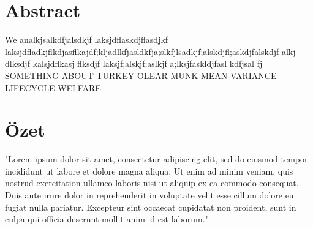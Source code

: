 \chapter*{Abstract}
\ttitle

\vspace{20pt}

We analkjsalkdfjalsdkjf laksjdflaskdjflasdjkf laksjdfladkjflkdjasflkajdf;kljadlkfjasldkfja;slkfjlsadkjf;alskdjfl;askdjfalskdjf alkj dlksdjf kalsjdflkasj flksdjf laksjf;alskjf;aslkjf a;lksjfaskldjfasl kdfjsal fj
SOMETHING ABOUT TURKEY OLEAR MUNK MEAN VARIANCE LIFECYCLE WELFARE .

\newpage

\chapter*{Özet}

\ttitletr

\vspace{20pt}

"Lorem ipsum dolor sit amet, consectetur adipiscing elit, sed do eiusmod tempor incididunt ut labore et dolore magna aliqua. Ut enim ad minim
veniam, quis nostrud exercitation ullamco laboris nisi ut aliquip ex ea commodo consequat. Duis aute irure dolor in reprehenderit in
voluptate velit esse cillum dolore eu fugiat nulla pariatur. Excepteur sint occaecat cupidatat non proident, sunt in culpa qui officia
deserunt mollit anim id est laborum."

